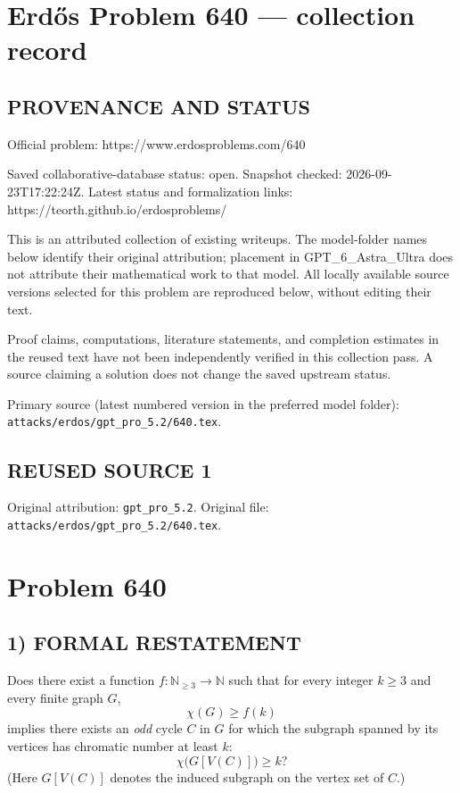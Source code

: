 \section*{Erd\H{o}s Problem 640 --- collection record}

\subsection*{PROVENANCE AND STATUS}
Official problem: https://www.erdosproblems.com/640

Saved collaborative-database status: open.
Snapshot checked: 2026-09-23T17:22:24Z.
Latest status and formalization links: https://teorth.github.io/erdosproblems/

This is an attributed collection of existing writeups. The model-folder names below identify their original attribution; placement in GPT\_6\_Astra\_Ultra does not attribute their mathematical work to that model. All locally available source versions selected for this problem are reproduced below, without editing their text.

Proof claims, computations, literature statements, and completion estimates in the reused text have not been independently verified in this collection pass. A source claiming a solution does not change the saved upstream status.

Primary source (latest numbered version in the preferred model folder): \texttt{attacks/erdos/gpt\_pro\_5.2/640.tex}.

\subsection*{REUSED SOURCE 1}
Original attribution: \texttt{gpt\_pro\_5.2}.
Original file: \texttt{attacks/erdos/gpt\_pro\_5.2/640.tex}.

\section*{Problem 640}

\subsection*{1) FORMAL RESTATEMENT}
Does there exist a function $f:\mathbb N_{\ge 3}\to\mathbb N$ such that for every integer $k\ge 3$ and every finite graph $G$,
\[
  \chi(G)\ge f(k)
\]
implies there exists an \emph{odd} cycle $C$ in $G$ for which the subgraph spanned by its vertices has chromatic number at least $k$:
\[
  \chi\bigl(G[V(C)]\bigr)\ge k?
\]
(Here $G[V(C)]$ denotes the induced subgraph on the vertex set of $C$.)

